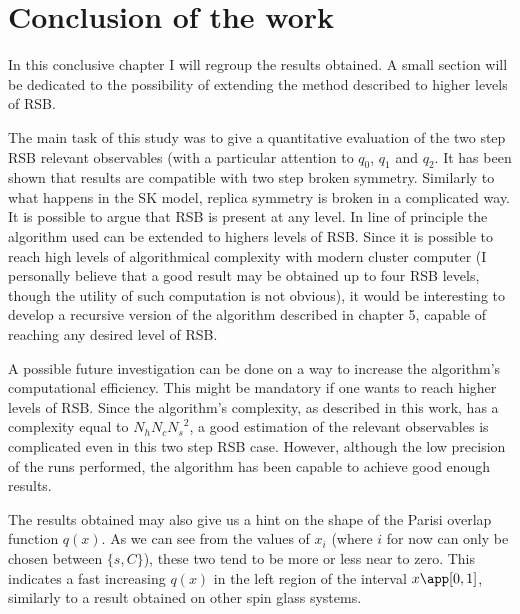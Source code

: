 \chapter{Conclusion of the work}

In this conclusive chapter I will regroup the results obtained. A small section will be dedicated to the possibility of extending the method described to higher levels of RSB.

The main task of this study was to give a quantitative evaluation of the two step RSB  relevant observables (with a particular attention to $q_0$, $q_1$ and $q_2$. It has been shown that results are compatible with two step broken symmetry. Similarly to what happens in the SK model, replica symmetry is broken in a complicated way.
It is possible to argue that RSB is present at any level. In line of principle the algorithm used can be extended to highers levels of RSB. Since it is possible to reach high levels of algorithmical complexity with modern cluster computer (I personally believe that a good result may be obtained up to four RSB levels, though the utility of such computation is not obvious), it would be interesting to develop a recursive version of the algorithm described in chapter 5, capable of reaching any desired level of RSB.

A possible future investigation can be done on a way to increase the algorithm's computational efficiency. This might be mandatory if one wants to reach higher levels of RSB. Since the algorithm's complexity, as described in this work, has a complexity equal to $N_h N_c {N_s} ^ 2$, a good estimation of the relevant observables is complicated even in this two step RSB case. However, although the low precision of the runs performed, the algorithm has been capable to achieve good enough results.

The results obtained may also give us a hint on the shape of the Parisi overlap function $q(x)$. As we can see from the values of $x_i$ (where $i$ for now can only be chosen between $\{ s, C\}$), these two tend to be more or less near to zero. This indicates a fast increasing $q(x)$ in the left region of the interval $x \app [0,1]$, similarly to a result obtained on other spin glass systems\cite{function}.
